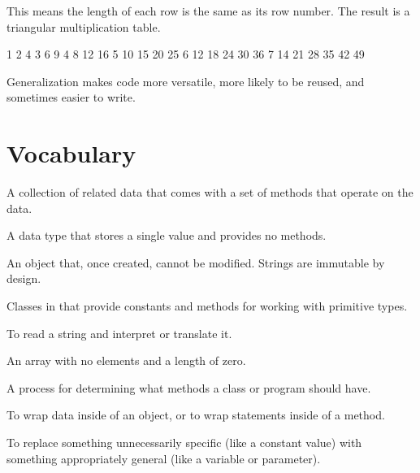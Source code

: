This means the length of each row is the same as its row number.
The result is a triangular multiplication table.

\begin{stdout}
   1
   2   4
   3   6   9
   4   8  12  16
   5  10  15  20  25
   6  12  18  24  30  36
   7  14  21  28  35  42  49
\end{stdout}

Generalization makes code more versatile, more likely to be reused, and sometimes easier to write.






\section{Vocabulary}

\begin{description}

A collection of related data that comes with a set of methods that operate on the data.

A data type that stores a single value and provides no methods.

An object that, once created, cannot be modified.
Strings are immutable by design.

Classes in  that provide constants and methods for working with primitive types.

To read a string and interpret or translate it.

An array with no elements and a length of zero.

A process for determining what methods a class or program should have.

To wrap data inside of an object, or to wrap statements inside of a method.

To replace something unnecessarily specific (like a constant value) with something appropriately general (like a variable or parameter).

\end{description}


